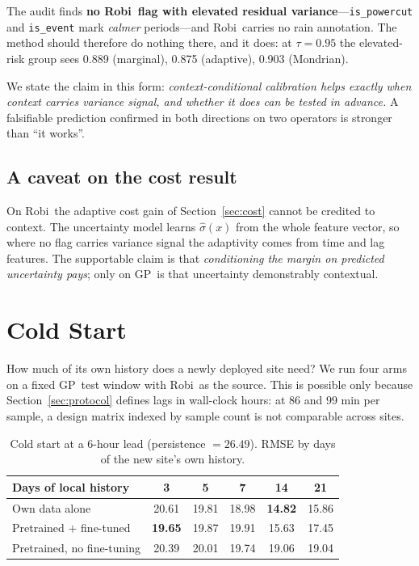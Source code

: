 \documentclass[conference]{IEEEtran}
\newcommand{\gpx}{GP}
\newcommand{\robix}{Robi}
\begin{document}
The audit finds \textbf{no \robix\ flag with elevated residual
variance}---\texttt{is\_powercut} and \texttt{is\_event} mark \emph{calmer}
periods---and \robix\ carries no rain annotation. The method should therefore do
nothing there, and it does: at $\tau = 0.95$ the elevated-risk group sees 0.889
(marginal), 0.875 (adaptive), 0.903 (Mondrian).

We state the claim in this form: \emph{context-conditional calibration helps exactly
when context carries variance signal, and whether it does can be tested in advance.} A
falsifiable prediction confirmed in both directions on two operators is stronger than
``it works''.

\subsection{A caveat on the cost result}

On \robix\ the adaptive cost gain of Section~\ref{sec:cost} cannot be credited to
context. The uncertainty model learns $\hat{\sigma}(x)$ from the whole feature vector,
so where no flag carries variance signal the adaptivity comes from time and lag
features. The supportable claim is that \emph{conditioning the margin on predicted
uncertainty pays}; only on \gpx\ is that uncertainty demonstrably contextual.

\section{Cold Start}
\label{sec:coldstart}

How much of its own history does a newly deployed site need? We run four arms on a
fixed \gpx\ test window with \robix\ as the source. This is possible only because
Section~\ref{sec:protocol} defines lags in wall-clock hours: at 86 and 99 min per
sample, a design matrix indexed by sample count is not comparable across sites.

\begin{table}[htbp]
\caption{Cold start at a 6-hour lead (persistence $=26.49$). RMSE by days of the new
site's own history.}
\label{tab:coldstart}
\centering
\setlength{\tabcolsep}{4pt}
\begin{tabular}{lccccc}
\toprule
\textbf{Days of local history} & 3 & 5 & 7 & 14 & 21 \\
\midrule
Own data alone & 20.61 & 19.81 & 18.98 & \textbf{14.82} & 15.86 \\
Pretrained $+$ fine-tuned & \textbf{19.65} & 19.87 & 19.91 & 15.63 & 17.45 \\
Pretrained, no fine-tuning & 20.39 & 20.01 & 19.74 & 19.06 & 19.04 \\
\bottomrule
\end{tabular}
\end{table}
\end{document}
